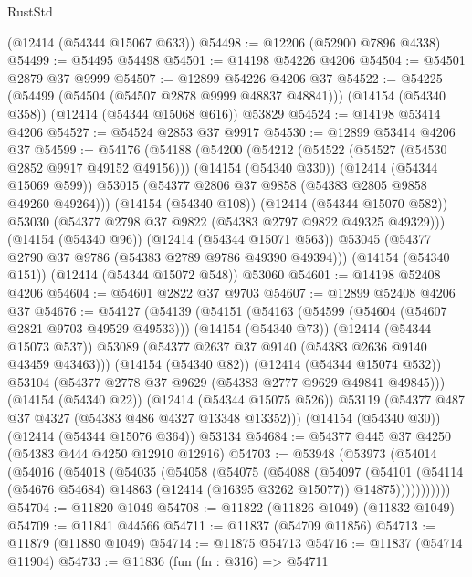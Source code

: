 \begin{lexlean}{RustStd}
\begin{coremodule}
{\begin{coremodule}
{{{{{{{{{{{{{{{{{{{{{{{{{{{{{{{{{{{{{{{{{{{{{{{{{{    (@12414 (@54344 @15067 @633))
@54498 := @12206 (@52900 @7896 @4338)
@54499 := @54495 @54498
@54501 := @14198 @54226 @4206
@54504 := @54501 @2879 @37 @9999
@54507 := @12899 @54226 @4206 @37
@54522 := @54225
    (@54499 (@54504 (@54507 @2878 @9999 @48837 @48841)))
    (@14154 (@54340 @358))
    (@12414 (@54344 @15068 @616))
    @53829
@54524 := @14198 @53414 @4206
@54527 := @54524 @2853 @37 @9917
@54530 := @12899 @53414 @4206 @37
@54599 := @54176
    (@54188
      (@54200
        (@54212
          (@54522 (@54527 (@54530 @2852 @9917 @49152 @49156)))
          (@14154 (@54340 @330))
          (@12414 (@54344 @15069 @599))
          @53015
          (@54377 @2806 @37 @9858 (@54383 @2805 @9858 @49260 @49264)))
        (@14154 (@54340 @108))
        (@12414 (@54344 @15070 @582))
        @53030
        (@54377 @2798 @37 @9822 (@54383 @2797 @9822 @49325 @49329)))
      (@14154 (@54340 @96))
      (@12414 (@54344 @15071 @563))
      @53045
      (@54377 @2790 @37 @9786 (@54383 @2789 @9786 @49390 @49394)))
    (@14154 (@54340 @151))
    (@12414 (@54344 @15072 @548))
    @53060
@54601 := @14198 @52408 @4206
@54604 := @54601 @2822 @37 @9703
@54607 := @12899 @52408 @4206 @37
@54676 := @54127
    (@54139
      (@54151
        (@54163
          (@54599 (@54604 (@54607 @2821 @9703 @49529 @49533)))
          (@14154 (@54340 @73))
          (@12414 (@54344 @15073 @537))
          @53089
          (@54377 @2637 @37 @9140 (@54383 @2636 @9140 @43459 @43463)))
        (@14154 (@54340 @82))
        (@12414 (@54344 @15074 @532))
        @53104
        (@54377 @2778 @37 @9629 (@54383 @2777 @9629 @49841 @49845)))
      (@14154 (@54340 @22))
      (@12414 (@54344 @15075 @526))
      @53119
      (@54377 @487 @37 @4327 (@54383 @486 @4327 @13348 @13352)))
    (@14154 (@54340 @30))
    (@12414 (@54344 @15076 @364))
    @53134
@54684 := @54377 @445 @37 @4250 (@54383 @444 @4250 @12910 @12916)
@54703 := @53948
    (@53973
      (@54014
        (@54016
          (@54018
            (@54035
              (@54058
                (@54075
                  (@54088
                    (@54097
                      (@54101
                        (@54114
                          (@54676 @54684)
                          @14863
                          (@12414 (@16395 @3262 @15077))
                          @14875)))))))))))
@54704 := @11820 @1049
@54708 := @11822 (@11826 @1049) (@11832 @1049)
@54709 := @11841 @44566
@54711 := @11837 (@54709 @11856)
@54713 := @11879 (@11880 @1049)
@54714 := @11875 @54713
@54716 := @11837 (@54714 @11904)
@54733 := @11836
    (fun (fn : @316) =>
    @54711
}}}}}}}}}}}}}}}}}}}}}}}}}}}}}}}}}}}}}}}}}}}}}}}}}}
\end{coremodule}}
\end{coremodule}
\end{lexlean}
